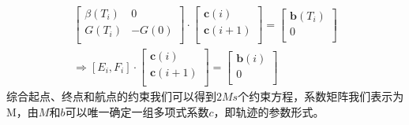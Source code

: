 \documentclass[master,academic]{ysuthesis} %
\begin{document}
			\begin{equation}
				\begin{aligned}
					\left[ \begin{matrix}
						\beta ( T_i )&		0\\
						G( T_i )&		-G( 0 )\\
					\end{matrix} \right] \cdot \left[ \begin{array}{c}
						\mathbf{c}( i )\\
						\mathbf{c}( i+1 )\\
					\end{array} \right] =\left[ \begin{array}{c}
						\mathbf{b}( T_i )\\
						0\\
					\end{array} \right] \\
					\Longrightarrow \left[ E_i,F_i \right] \cdot \left[ \begin{array}{c}
						\mathbf{c}( i )\\
						\mathbf{c}( i+1 )\\
					\end{array} \right] =\left[ \begin{array}{c}
						\mathbf{b}( i )\\
						0\\
					\end{array} \right] 
				\end{aligned}
			\end{equation}
			综合起点、终点和航点的约束我们可以得到$2Ms$个约束方程，系数矩阵我们表示为M，由$M$和$b$可以唯一确定一组多项式系数$c$，即轨迹的参数形式。
\end{document}
